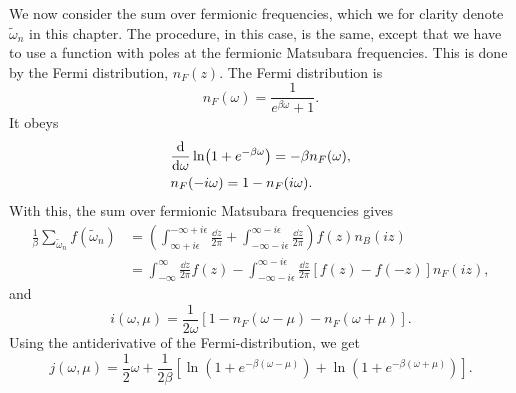 We now consider the sum over fermionic frequencies, which we for clarity denote $\tilde \omega_n$ in this chapter.
The procedure, in this case, is the same, except that we have to use a function with poles at the fermionic Matsubara frequencies.
This is done by the Fermi distribution, $n_F(z)$.
The Fermi distribution is
\begin{equation}
    n_F(\omega) = \frac{1}{e^{\beta \omega} + 1}.
\end{equation}
It obeys
\begin{align}
    &\odv{}{\omega} \ln(1 + e^{-\beta \omega}) = - \beta n_F(\omega), \\
    & n_F(- i\omega) = 1 - n_F(i\omega).
\end{align}
With this, the sum over fermionic Matsubara frequencies gives
\begin{align}
    \frac{1}{\beta} \sum_{\tilde \omega_n} f(\tilde \omega_n)
    & = \left(
        \int_{\infty + i \epsilon}^{-\infty + i \epsilon} \frac{\dd z}{2 \pi} 
        + \int_{-\infty - i \epsilon}^{\infty - i \epsilon}\frac{\dd z}{2 \pi}
    \right) 
    f(z) n_B(i z) \\
    & =
    \int_{-\infty}^{\infty} \frac{\dd z}{2 \pi} f(z)
    -
    \int_{-\infty - i \epsilon}^{\infty - i \epsilon}\frac{\dd z}{2 \pi}
    \left[
        f(z) - f(-z)
    \right]
    n_F(iz),
\end{align}
and 
\begin{equation}
    i(\omega, \mu) = \frac{1}{2 \omega} [1 - n_F(\omega - \mu) - n_F(\omega + \mu)].
\end{equation}
Using the antiderivative of the Fermi-distribution, we get
\begin{equation}
    j(\omega, \mu) 
    = \frac{1}{2} \omega 
    + \frac{1}{2 \beta }
    \left[
        \ln\left(1 + e^{-\beta(\omega - \mu)}\right)
        + \ln\left(1 + e^{-\beta(\omega + \mu)}\right)
    \right].
\end{equation}

